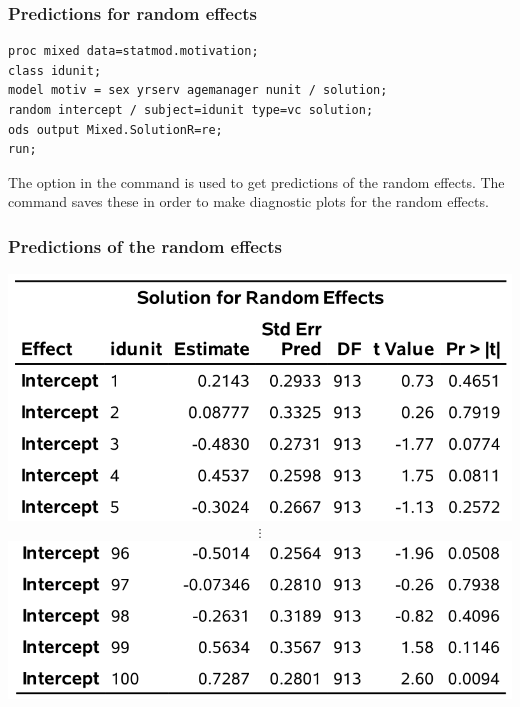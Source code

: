 \documentclass{beamer}
\begin{document}
\begin{frame}[fragile]
\frametitle{Predictions for random effects}
\begin{tcolorbox}[colback=white, colframe=hecblue, title=\SASlang{} code for the random intercept model]
\begin{small}
\begin{verbatim}
proc mixed data=statmod.motivation;
class idunit;
model motiv = sex yrserv agemanager nunit / solution;
random intercept / subject=idunit type=vc solution;
ods output Mixed.SolutionR=re;
run;
\end{verbatim}
\end{small}
\end{tcolorbox}
\begin{small} The option  in the command  is used to get predictions of the random effects. The command 
saves these in order to make diagnostic plots for the random effects.\end{small}
\end{frame}

\begin{frame}
\frametitle{Predictions of the random effects}
\begin{center}
\includegraphics[width = 0.7\linewidth]{img/c6/slides7-e19}
\begin{align*}
 \vdots
\end{align*}
\includegraphics[width = 0.7\linewidth]{img/c6/slides7-e20}
\end{center}
\end{frame}
\end{document}

